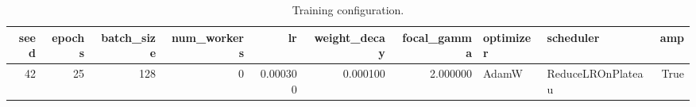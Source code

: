 \begin{table}
\caption{Training configuration.}
\label{tab:training_configuration_table}
\begin{tabular}{rrrrrrrllr}
\toprule
seed & epochs & batch\_size & num\_workers & lr & weight\_decay & focal\_gamma & optimizer & scheduler & amp \\
\midrule
42 & 25 & 128 & 0 & 0.000300 & 0.000100 & 2.000000 & AdamW & ReduceLROnPlateau & True \\
\bottomrule
\end{tabular}
\end{table}
